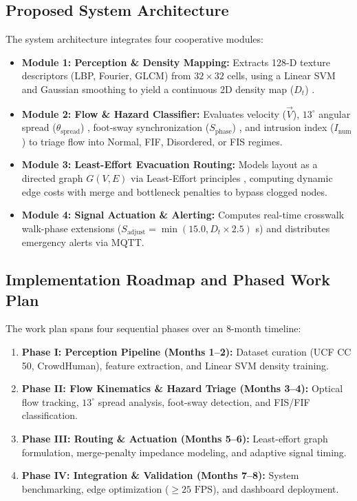 \documentclass[12pt,a4paper]{article}
\begin{document}
\subsection{Proposed System Architecture}
The system architecture integrates four cooperative modules:
\begin{itemize}
    \item \textbf{Module 1: Perception \& Density Mapping:} Extracts 128-D texture descriptors (LBP, Fourier, GLCM) from $32 \times 32$ cells, using a Linear SVM and Gaussian smoothing to yield a continuous 2D density map ($D_t$) \cite{basalamah2020pedestrian, khan2026deep}.
    \item \textbf{Module 2: Flow \& Hazard Classifier:} Evaluates velocity ($\vec{V}$), $13^\circ$ angular spread ($\theta_{\text{spread}}$) \cite{bacik2023lane, bacik2025logic}, foot-sway synchronization ($S_{\text{phase}}$) \cite{scienceadv2025foot}, and intrusion index ($I_{\text{num}}$) to triage flow into Normal, FIF, Disordered, or FIS regimes.
    \item \textbf{Module 3: Least-Effort Evacuation Routing:} Models layout as a directed graph $G(V,E)$ via Least-Effort principles \cite{zipf1949human, guy2010pledestrians}, computing dynamic edge costs with merge and bottleneck penalties to bypass clogged nodes.
    \item \textbf{Module 4: Signal Actuation \& Alerting:} Computes real-time crosswalk walk-phase extensions ($S_{\text{adjust}} = \min(15.0, D_t \times 2.5)$ s) \cite{maitra2024kolkata} and distributes emergency alerts via MQTT.
\end{itemize}

\subsection{Implementation Roadmap and Phased Work Plan}
The work plan spans four sequential phases over an 8-month timeline:
\begin{enumerate}
    \item \textbf{Phase I: Perception Pipeline (Months 1--2):} Dataset curation (UCF CC 50, CrowdHuman), feature extraction, and Linear SVM density training.
    \item \textbf{Phase II: Flow Kinematics \& Hazard Triage (Months 3--4):} Optical flow tracking, $13^\circ$ spread analysis, foot-sway detection, and FIS/FIF classification.
    \item \textbf{Phase III: Routing \& Actuation (Months 5--6):} Least-effort graph formulation, merge-penalty impedance modeling, and adaptive signal timing.
    \item \textbf{Phase IV: Integration \& Validation (Months 7--8):} System benchmarking, edge optimization ($\ge 25\text{ FPS}$), and dashboard deployment.
\end{enumerate}
\end{document}
